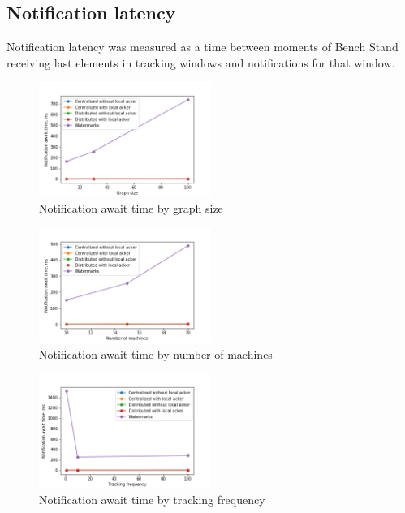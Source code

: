 \subsection{Notification latency}

Notification latency was measured as a time between moments of Bench Stand receiving last elements in tracking windows and notifications for that window.

\begin{figure}[htbp]
  \centering
  \includegraphics[width=0.50\textwidth]{pics/notification_await_time_by_graph_size.png}
  \caption{Notification await time by graph size}
\end{figure}
\begin{figure}[htbp]
  \centering
  \includegraphics[width=0.50\textwidth]{pics/notification_await_time_by_number_of_machines.png}
  \caption{Notification await time by number of machines}
\end{figure}
\begin{figure}[htbp]
  \centering
  \includegraphics[width=0.50\textwidth]{pics/notification_await_time_by_tracking_frequency.png}
  \caption{Notification await time by tracking frequency}
\end{figure}

